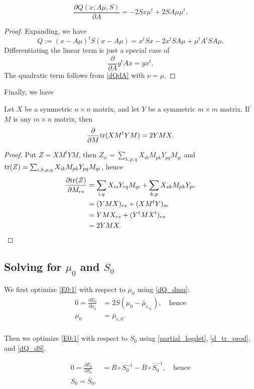 \documentclass[12pt,leqno]{article}
\begin{document}
\begin{Cor}\label{dM}
  $$
  \frac{\partial{Q(x;A\mu,S)}}{\partial{A}} = -2Sx\mu^t + 2SA\mu\mu^t.
  $$
\end{Cor}
\begin{proof}
Expanding, we have
$$
Q := (x-A\mu)^tS(x-A\mu) = x^tSx - 2x^tSA\mu + \mu^tA^tSA\mu.
$$
Differentiating the linear term is just a special case of
$$
 \frac{\partial}{\partial{A}}y^tAx = yx^t.
$$
The quadratic term follows from \eqref{dQdA} with $\nu = \mu$.
\end{proof}
Finally, we have
\begin{Lem} \label{d_tr_prod} Let $X$ be a symmetric $n\times{n}$ matrix, and let $Y$ be a symmetric $m\times{m}$
  matrix. If $M$ is any $m\times{n}$ matrix, then
  $$
  \frac{\partial}{\partial{M}}\text{\rm tr}(XM^tYM) = 2YMX.
  $$
\end{Lem}
\begin{proof}
  Put $Z = XM^tYM$, then $Z_{ii} = \sum_{k,p,q}X_{ik}M_{pk}Y_{pq}M_{qi}$ and
  $\text{\rm tr}(Z) = \sum_{i,k,p,q}X_{ik}M_{pk}Y_{pq}M_{qi}$, hence
  \begin{align*}
    \frac{\partial\text{\rm tr}(Z)}{\partial{M_{rs}}} &= \sum_{i,q}X_{is}Y_{rq}M_{qi} + \sum_{k,p}X_{sk}M_{pk}Y_{pr}\\
    &= (YMX)_{rs} + (XM^tY)_{sr} \\
    &= YMX_{rs} + (Y^tMX^t)_{rs} \\
    &= 2YMX.
    \end{align*}
\end{proof}

\subsection{Solving for  $\mu_0$ and $S_0$}
We first optimize \eqref{E0:1} with respect to $\mu_0$ using \eqref{dQ_dmu}:
\begin{equation} \label{mu_0} 
  \begin{split}
  0 = \frac{\partial{E_0}}{\partial{\mu_0}} &= 2S(\mu_0-\bar{\mu}_{c,_0}),\quad\text{hence}\\
    \mu_0 &= \bar{\mu}_{c,0}.\\
  \end{split}
\end{equation}

Then we optimize \eqref{E0:1} with respect to $S_0$ using \eqref{partial_logdet}, \eqref{d_tr_prod}, and \eqref{dQ_dS}.

\begin{equation}\label{S_0}
  \begin{split}
  0 = \frac{\partial{E_0}}{\partial{S_0}} &= B\circ{S_0^{-1}}- B\circ\overline{S}_0^{-1}, \quad\text{hence}\\
  S_0 = \overline{S}_0.\\
  \end{split}
\end{equation}
\end{document}
